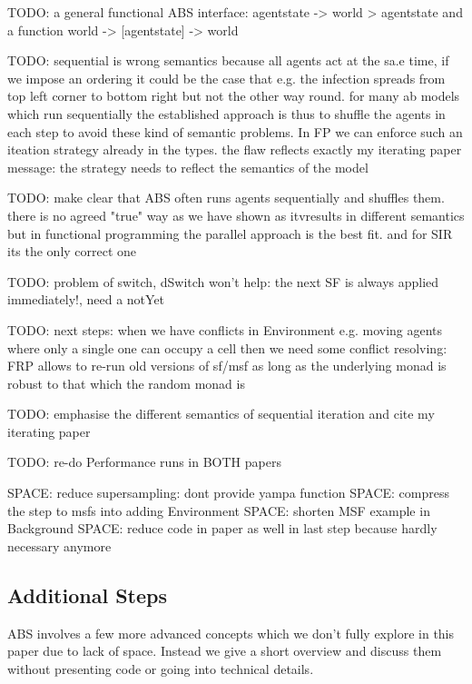TODO: a general functional ABS interface: agentstate -> world > agentstate and a function world -> [agentstate] -> world

TODO: sequential is wrong semantics because all agents act at the sa.e time, if we impose an ordering it could be the case that e.g. the infection spreads from top left corner to bottom right but not the other way round. for many ab models which run sequentially the established approach is thus to shuffle the agents in each step to avoid these kind of semantic problems. In FP we can enforce such an iteation strategy already in the types. the flaw reflects exactly my iterating paper message: the strategy needs to reflect the semantics of the model

TODO: make clear that ABS often runs agents sequentially and shuffles them. there is no agreed "true" way as we have shown as itvresults in different semantics but in  functional programming the parallel approach is the best fit. and for SIR its the only correct one

TODO: problem of switch, dSwitch won't help: the next SF is always applied immediately!, need a notYet

TODO: next steps: when we have conflicts in Environment e.g. moving agents where only a single one can occupy a cell then we need some conflict resolving: FRP allows to re-run old versions of sf/msf as long as the underlying monad is robust to that which the random monad is

TODO: emphasise the different semantics of sequential iteration and cite my iterating paper 

TODO: re-do Performance runs in BOTH papers

SPACE: reduce supersampling: dont provide yampa function
SPACE: compress the step to msfs into adding Environment
SPACE: shorten MSF example in Background
SPACE: reduce code in paper as well in last step because hardly necessary anymore







\subsection{Additional Steps}
ABS involves a few more advanced concepts which we don't fully explore in this paper due to lack of space. Instead we give a short overview and discuss them without presenting code or going into technical details.

